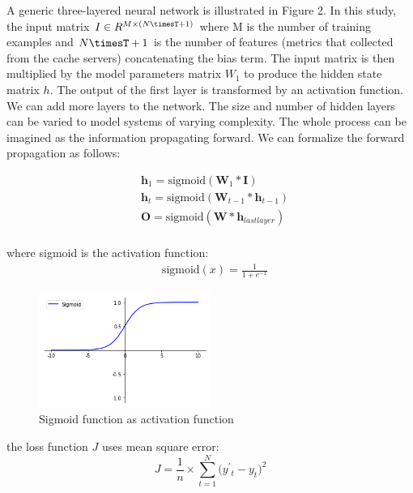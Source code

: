 \documentclass[5p]{elsarticle}
\begin{document}
A generic three-layered neural network is illustrated in Figure 2. In this study, the input matrix $I \in R^{M\times(N\timesT+1)}$  where M is the number of training examples and $N\timesT+1$ is the number of features (metrics that collected from the cache servers) concatenating the bias term. The input matrix is then multiplied by the model parameters matrix $W_1$ to produce the hidden state matrix $h$. The output of the first layer is transformed by an activation function. We can add more layers to the network. The size and number of hidden layers can be varied to model systems of varying complexity. The whole process can be imagined as the information propagating forward. We can formalize the forward propagation as follows:

\begin{equation}
    \begin{split}
    & \mathbf h_1 = \text{sigmoid}(\mathbf W_1 * \mathbf I) \\
    & \mathbf h_t = \text{sigmoid}(\mathbf W_{t-1} * \mathbf h_{t-1}) \\
    & \mathbf O=\text{sigmoid}(\mathbf W * \mathbf h_{lastlayer}) \\
    \end{split}
\end{equation}

where sigmoid is the activation function:
\begin{equation}
    \begin{split}
    & \text{sigmoid}(x)=\frac{1}{1+e^{-x}}
    \end{split}
\end{equation}

\begin{figure}[h]
    \centering
    \includegraphics[width=0.5\textwidth]{sigmoid.png}
    \caption{Sigmoid function as activation function}
    \label{fig:sigmoid}
\end{figure}

the loss function $J$ uses mean square error:
    $$J=\frac{1}{n}\times{\sum_{t=1}^N(y^{'}{_t}-y_t})^2$$
\end{document}

